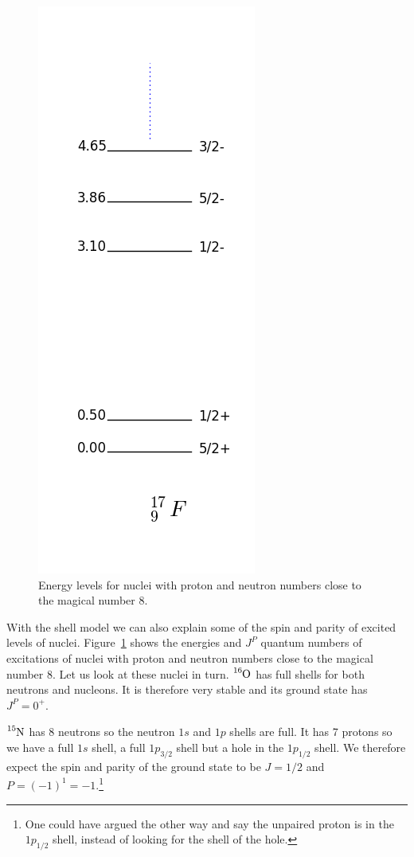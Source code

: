 \documentclass[12pt]{article}
\begin{document}
\begin{figure}
\begin{center}
\includegraphics[scale=0.4]{images/levels_17F.png}
\caption{Energy levels for nuclei with proton and neutron numbers close to the magical number 8.}\label{fig:levelsNOOOF}
\end{center}
\end{figure}

With the shell model we can also explain some of the spin and parity of excited levels of nuclei. Figure~\ref{fig:levelsNOOOF} shows the energies and $J^P$ quantum numbers of excitations of nuclei with proton and neutron numbers close to the magical number $8$. Let us look at these nuclei in turn. $\ce{^{16}O}$ has full shells for both neutrons and nucleons. It is therefore very stable and its ground state has $J^P=0^+$.

$\ce{^{15}N}$ has 8 neutrons so the neutron $1s$ and $1p$ shells are full. It has 7 protons so we have a full $1s$ shell, a full $1p_{3/2}$ shell but a hole in the $1p_{1/2}$ shell. We therefore expect the spin and parity of the ground state to be $J=1/2$ and $P=(-1)^1=-1$.\footnote{One could have argued the other way and say the unpaired proton is in the $1p_{1/2}$ shell, instead of looking for the shell of the hole.}
\end{document}
